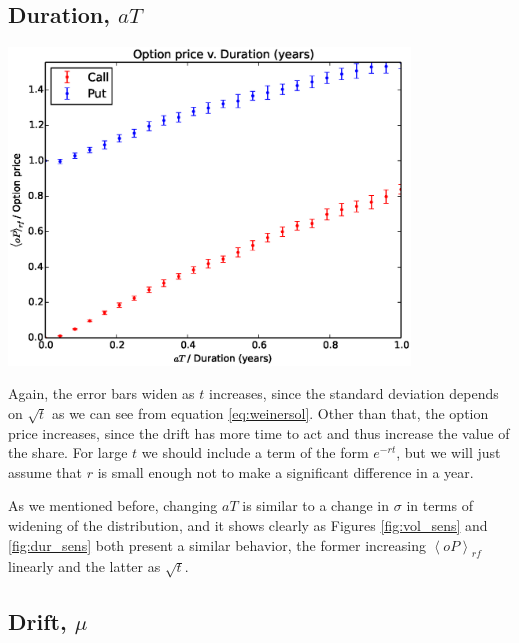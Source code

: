 \documentclass[8 pt]{article}
\newcommand{\avg}[1]{\left\langle #1 \right\rangle}
\newenvironment{Figure}
  {\par\medskip\noindent\minipage{\linewidth}}
  {\endminipage\par\medskip}
\begin{document}
\begin{multicols*}{2}
\vfill

\subsection{Duration, $aT$}

\begin{Figure}
  \begin{center}
    \includegraphics[width=0.8\textwidth]{graphs/oP_dur.eps}
    \label{fig:dur_sens}
  \end{center}
\end{Figure}

Again, the error bars widen as $t$ increases, since the standard deviation depends on $\sqrt{t}$ as we can see from equation \ref{eq:weinersol}. Other than that, the option price increases, since the drift has more time to act and thus increase the value of the share. For large $t$ we should include a term of the form $e^{-rt}$, but we will just assume that $r$ is small enough not to make a significant difference in a year.

As we mentioned before, changing $aT$ is similar to a change in $\sigma$ in terms of widening of the distribution, and it shows clearly as Figures \ref{fig:vol_sens} and \ref{fig:dur_sens} both present a similar behavior, the former increasing $\avg{oP}_{rf}$ linearly and the latter as $\sqrt{t}$.

\subsection{Drift, $\mu$}


\end{multicols*}
\end{document}
